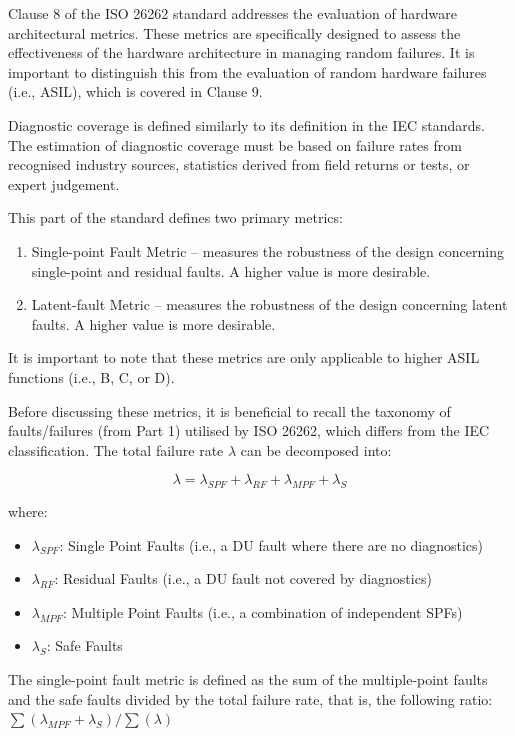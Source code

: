 \documentclass[./dissertation.tex]{subfiles}
\begin{document}
Clause 8 of the ISO 26262 standard addresses the evaluation of hardware architectural metrics. These metrics are specifically designed to assess the effectiveness of the hardware architecture in managing random failures. It is important to distinguish this from the evaluation of random hardware failures (i.e., ASIL), which is covered in Clause 9.

Diagnostic coverage is defined similarly to its definition in the IEC standards. The estimation of diagnostic coverage must be based on failure rates from recognised industry sources, statistics derived from field returns or tests, or expert judgement.

This part of the standard defines two primary metrics:

\begin{enumerate}
\item Single-point Fault Metric – measures the robustness of the design concerning single-point and residual faults. A higher value is more desirable.
\item Latent-fault Metric – measures the robustness of the design concerning latent faults. A higher value is more desirable.
\end{enumerate}

It is important to note that these metrics are only applicable to higher ASIL functions (i.e., B, C, or D).

Before discussing these metrics, it is beneficial to recall the taxonomy of faults/failures (from Part 1) utilised by ISO 26262, which differs from the IEC classification. The total failure rate $\lambda$ can be decomposed into:

\begin{equation}
\lambda = \lambda_{SPF} + \lambda_{RF} + \lambda_{MPF} + \lambda_{S}
\end{equation}

where:

\begin{itemize}
\item $\lambda_{SPF}$: Single Point Faults (i.e., a DU fault where there are no diagnostics)
\item $\lambda_{RF}$: Residual Faults (i.e., a DU fault not covered by diagnostics)
\item $\lambda_{MPF}$: Multiple Point Faults (i.e., a combination of independent SPFs)
\item $\lambda_{S}$: Safe Faults
\end{itemize}

The single-point fault metric is defined as the sum of the multiple-point faults and the safe faults divided by the total failure rate, that is, the following ratio: $\sum(\lambda_{MPF} + \lambda_{S}) / \sum(\lambda)$
\end{document}
